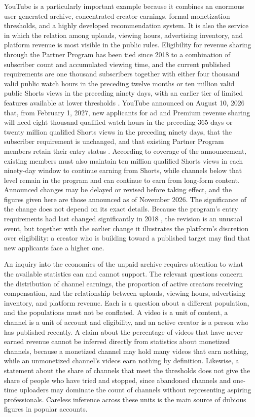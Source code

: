 \documentclass[11pt]{article}
\theoremstyle{remark}
\begin{document}
YouTube is a particularly important example because it combines an enormous user-generated archive, concentrated creator earnings, formal monetization thresholds, and a highly developed recommendation system. It is also the service in which the relation among uploads, viewing hours, advertising inventory, and platform revenue is most visible in the public rules. Eligibility for revenue sharing through the Partner Program has been tied since 2018 to a combination of subscriber count and accumulated viewing time, and the current published requirements are one thousand subscribers together with either four thousand valid public watch hours in the preceding twelve months or ten million valid public Shorts views in the preceding ninety days, with an earlier tier of limited features available at lower thresholds \cite{youtubehelp}. YouTube announced on August 10, 2026 that, from February 1, 2027, new applicants for ad and Premium revenue sharing will need eight thousand qualified watch hours in the preceding 365 days or twenty million qualified Shorts views in the preceding ninety days, that the subscriber requirement is unchanged, and that existing Partner Program members retain their entry status \cite{youtube2026}. According to coverage of the announcement, existing members must also maintain ten million qualified Shorts views in each ninety-day window to continue earning from Shorts, while channels below that level remain in the program and can continue to earn from long-form content. Announced changes may be delayed or revised before taking effect, and the figures given here are those announced as of November 2026. The significance of the change does not depend on its exact details. Because the program's entry requirements had last changed significantly in 2018 \cite{mediaweek2026}, the revision is an unusual event, but together with the earlier change it illustrates the platform's discretion over eligibility: a creator who is building toward a published target may find that new applicants face a higher one.

An inquiry into the economics of the unpaid archive requires attention to what the available statistics can and cannot support. The relevant questions concern the distribution of channel earnings, the proportion of active creators receiving compensation, and the relationship between uploads, viewing hours, advertising inventory, and platform revenue. Each is a question about a different population, and the populations must not be conflated. A video is a unit of content, a channel is a unit of account and eligibility, and an active creator is a person who has published recently. A claim about the percentage of videos that have never earned revenue cannot be inferred directly from statistics about monetized channels, because a monetized channel may hold many videos that earn nothing, while an unmonetized channel's videos earn nothing by definition. Likewise, a statement about the share of channels that meet the thresholds does not give the share of people who have tried and stopped, since abandoned channels and one-time uploaders may dominate the count of channels without representing aspiring professionals. Careless inference across these units is the main source of dubious figures in popular accounts.
\end{document}
